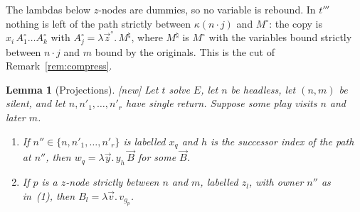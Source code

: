 \documentclass[11pt]{article}
\newcommand{\suc}[2]{#1{\cdot}#2}
\newcommand{\New}{\textsf{[new]}}
\theoremstyle{plain}
\newtheorem{lemma}[theorem]{Lemma}
\theoremstyle{definition}
\theoremstyle{remark}
\begin{document}
The lambdas below $z$-nodes are dummies, so no variable is rebound.
In $t'''$ nothing is left of the path strictly between
$\kappa(\suc nj)$ and $M^\circ$: the copy is
$x_i\,A^\circ_1\dots A^\circ_k$ with $A^\circ_j=\lambda\vec z^\circ.\,M^\natural$,
where $M^\natural$ is $M^\circ$ with the variables bound strictly between
$\suc nj$ and $m$ bound by the originals.  This is the cut of
Remark~\ref{rem:compress}.

\begin{lemma}[Projections]\label{lem:proj}
\New{} Let $t$ solve $E$, let $n$ be headless, let $(n,m)$ be silent,
and let $n,n'_1,\dots,n'_r$ have single return.  Suppose some play
visits $n$ and later $m$.
\begin{enumerate}
\item If $n''\in\{n,n'_1,\dots,n'_r\}$ is labelled $x_q$ and $h$ is the
  successor index of the path at $n''$, then
  $w_q=\lambda\vec y.\,y_h\,\vec B$ for some $\vec B$.
\item If $p$ is a $z$-node strictly between $n$ and $m$, labelled $z_l$,
  with owner $n''$ as in~(1), then $B_l=\lambda\vec v.\,v_{g_p}$.
\end{enumerate}
\end{lemma}
\end{document}
